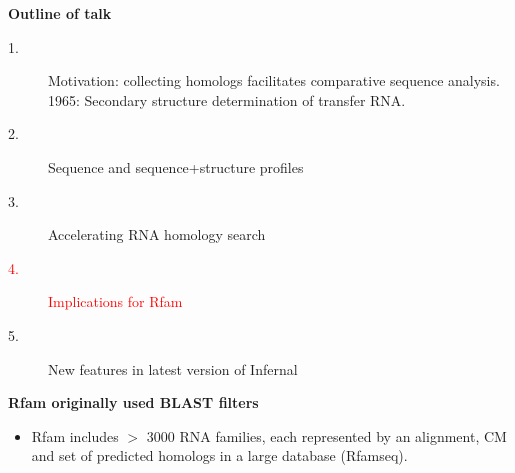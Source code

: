 \documentclass[landscape]{slides}
\begin{document}
\begin{slide}
\begin{slide}
\vfill 
\end{slide}


\begin{slide}
\begin{center}
\textbf{Outline of talk}

\begin{description}
\item[1.] Motivation: collecting homologs facilitates comparative
  sequence analysis.\\ 1965: Secondary structure determination of
  transfer RNA.
\item[2.] Sequence and sequence+structure profiles
\item[3.] Accelerating RNA homology search
\item[\textcolor{red}{4.}] \textcolor{red}{Implications for Rfam}
\item[5.] New features in latest version of Infernal
\end{description}

\end{center}
\vfill
\end{slide}
\begin{slide}
\begin{center}

\textbf{Rfam originally used BLAST filters}

\end{center}

\begin{itemize}
\item Rfam includes $>$ 3000 RNA families, each represented by an
  alignment, CM and set of predicted homologs in a large database (Rfamseq).
\end{itemize}



\end{slide}
\end{slide}
\end{document}
